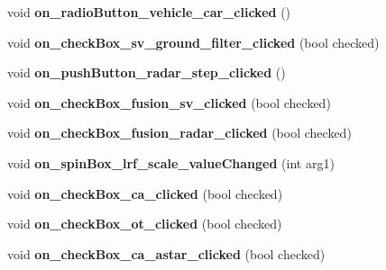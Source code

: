 \begin{DoxyCompactItemize}
\item 
\hypertarget{class_main_window_a4e48ef0bb1c417e09e0dd42dcf50e4cb}{}void {\bfseries on\+\_\+radio\+Button\+\_\+vehicle\+\_\+car\+\_\+clicked} ()\label{class_main_window_a4e48ef0bb1c417e09e0dd42dcf50e4cb}

\item 
\hypertarget{class_main_window_a9cb56cb4d8b2988da2c1cd9ae332d41f}{}void {\bfseries on\+\_\+check\+Box\+\_\+sv\+\_\+ground\+\_\+filter\+\_\+clicked} (bool checked)\label{class_main_window_a9cb56cb4d8b2988da2c1cd9ae332d41f}

\item 
\hypertarget{class_main_window_a2cc0f7e573c1329ce3a2fb515a2a70e0}{}void {\bfseries on\+\_\+push\+Button\+\_\+radar\+\_\+step\+\_\+clicked} ()\label{class_main_window_a2cc0f7e573c1329ce3a2fb515a2a70e0}

\item 
\hypertarget{class_main_window_aacc4d0f87925961ceb54b385f3b91c20}{}void {\bfseries on\+\_\+check\+Box\+\_\+fusion\+\_\+sv\+\_\+clicked} (bool checked)\label{class_main_window_aacc4d0f87925961ceb54b385f3b91c20}

\item 
\hypertarget{class_main_window_a7970ffc0361ac98d432d6b1cb7b012a4}{}void {\bfseries on\+\_\+check\+Box\+\_\+fusion\+\_\+radar\+\_\+clicked} (bool checked)\label{class_main_window_a7970ffc0361ac98d432d6b1cb7b012a4}

\item 
\hypertarget{class_main_window_a685831d7dce73aa998e7968b6f52df47}{}void {\bfseries on\+\_\+spin\+Box\+\_\+lrf\+\_\+scale\+\_\+value\+Changed} (int arg1)\label{class_main_window_a685831d7dce73aa998e7968b6f52df47}

\item 
\hypertarget{class_main_window_a2b9ba9ede10c1746dcf437149778147f}{}void {\bfseries on\+\_\+check\+Box\+\_\+ca\+\_\+clicked} (bool checked)\label{class_main_window_a2b9ba9ede10c1746dcf437149778147f}

\item 
\hypertarget{class_main_window_ad0248d5d33ec8ddf310e94f36e28773c}{}void {\bfseries on\+\_\+check\+Box\+\_\+ot\+\_\+clicked} (bool checked)\label{class_main_window_ad0248d5d33ec8ddf310e94f36e28773c}

\item 
\hypertarget{class_main_window_a6fb1b89e45b56331bafd74d1a823bc09}{}void {\bfseries on\+\_\+check\+Box\+\_\+ca\+\_\+astar\+\_\+clicked} (bool checked)\label{class_main_window_a6fb1b89e45b56331bafd74d1a823bc09}


\end{DoxyCompactItemize}
